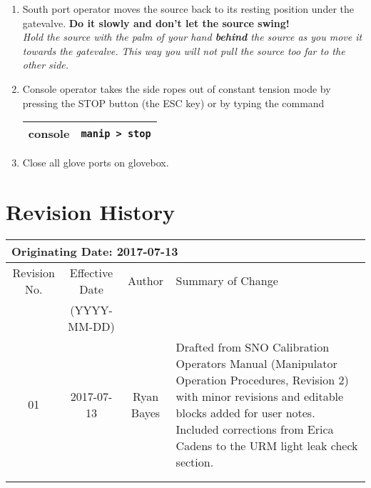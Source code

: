 \begin{enumerate}
\item \CheckBox[name=dsr16]{} South port operator moves the source back to its resting position under the gatevalve. {\bf Do it slowly and don't let the source swing!}\\ {\it Hold the source with the palm of your hand {\bf behind} the source as you move it towards the gatevalve. This way you will not pull the source too far to the other side.}
\item \CheckBox[name=dsr17]{} Console operator takes the side ropes out of constant tension mode by pressing the STOP button (the ESC key) or by typing the command
\begin{center}
\begin{tabular}{|c|c|}
\hline
console & \verb+manip > stop+\\
\hline
\end{tabular}
\end{center}
\item \CheckBox[name=dsr18]{} Close all glove ports on glovebox.
\end{enumerate}

\section{Revision History}
\begin{tabular}{|c|c|c|p{6cm}|}
\hline\hline
\multicolumn{4}{|l|}{Originating Date: 2017-07-13}\\
\hline
Revision No. & Effective Date & Author & Summary of Change \\
& (YYYY-MM-DD) & & \\
\hline
01 & 2017-07-13 & Ryan Bayes & Drafted from SNO Calibration Operators Manual (Manipulator Operation Procedures, Revision 2) with minor revisions and editable blocks added for user notes. Included corrections from Erica Cadens to the URM light leak check section. \\
\hline
& & & \\
\hline
& & & \\
\hline \hline

\end{tabular}

